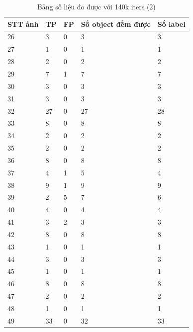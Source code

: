\begin{table}[H]
    \begin{tabular}{p{2cm}  p{2cm}  p{2cm} p{4cm} p{2cm} }
    \hline		
	STT ảnh & TP & FP & Số object đếm được & Số label\\
	\hline
   26  & 3  & 0  &     3     &   3   \\     \hline
   27  & 1  & 0  &     1     &   1   \\     \hline
   28  & 2  & 0  &     2     &   2   \\     \hline
   29  & 7  & 1  &     7     &   7   \\     \hline
   30  & 3  & 0  &     3     &   3   \\     \hline
   31  & 3  & 0  &     3     &   3   \\     \hline
   32  & 27 & 0  &     27    &   28  \\     \hline
   33  & 8  & 0  &     8     &   8   \\     \hline
   34  & 2  & 0  &     2     &   2   \\     \hline
   35  & 2  & 0  &     2     &   2   \\     \hline
   36  & 8  & 0  &     8     &   8   \\     \hline
   37  & 4  & 1  &     5     &   4   \\     \hline
   38  & 9  & 1  &     9     &   9   \\     \hline
   39  & 2  & 5  &     7     &   6   \\     \hline
   40  & 4  & 0  &     4     &   4   \\     \hline
   41  & 3  & 2  &     3     &   3   \\     \hline
   42  & 8  & 0  &     8     &   8   \\     \hline
   43  & 1  & 0  &     1     &   1   \\     \hline
   44  & 3  & 0  &     3     &   3   \\     \hline
   45  & 1  & 0  &     1     &   1   \\     \hline
   46  & 8  & 0  &     8     &   8   \\     \hline
   47  & 2  & 0  &     2     &   2   \\     \hline
   48  & 1  & 0  &     1     &   1   \\     \hline
   49  & 33 & 0  &     32    &   33  \\     \hline


	\end{tabular}
	\caption{Bảng số liệu đo được với 140k iters (2)}
    \label{chap3:case1:table01}    
\end{table}

